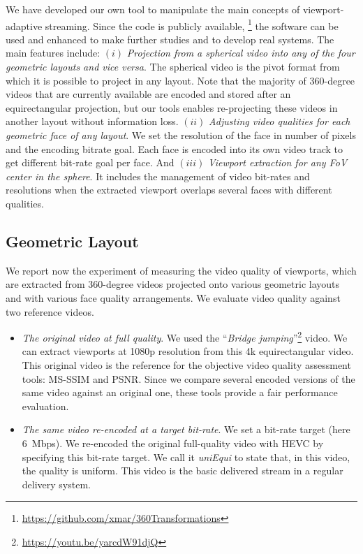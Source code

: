 We have developed our own tool to manipulate the main concepts
of viewport-adaptive streaming. Since the code is publicly available,%
\footnote{\url{https://github.com/xmar/360Transformations}} the software can be used and enhanced
to make further studies and to develop real systems. The main
features include: $(i)$ \emph{Projection from a spherical video into any of the four
geometric layouts and vice versa}. The spherical video is the pivot format from which it
is possible to project in any layout.
Note that the majority of 360-degree videos that are currently available are encoded and stored after
an equirectangular projection, but our tools enables re-projecting these videos
in another layout without information loss. $(ii)$ \emph{Adjusting video qualities for each
geometric face of any
layout}. We set the resolution of the face in number of
pixels and the encoding bitrate goal. Each face is encoded into its own video
track to get different
bit-rate goal per face. And $(iii)$ \emph{Viewport extraction for any \ac{FoV} center in the
sphere}. It includes the management of video bit-rates and resolutions
when the extracted viewport overlaps several faces with different qualities.

\subsection{Geometric Layout}

We report now the experiment of measuring the video quality of viewports, which
are extracted from 360-degree videos projected onto various geometric layouts and
with various
face quality arrangements. We evaluate video quality against two reference videos.
\begin{itemize}[leftmargin=7pt, itemindent=0pt, topsep=2pt, itemsep=0pt]
\item \emph{The original video at full quality}. We used the
``\emph{Bridge
jumping}''\footnote{\url{https://youtu.be/yarcdW91djQ}} video. We can extract viewports at 1080p resolution from this 4k equirectangular
video. This original video
is the reference for the objective video quality assessment tools: \ac{MS-SSIM} and
\ac{PSNR}. Since we compare several encoded versions of the same video against an original
one, these tools provide
a fair performance evaluation.
\item \emph{The same video re-encoded at a target bit-rate}. We set
a bit-rate target (here \SI{6}{\mega bps}). We
re-encoded the original full-quality video with \ac{HEVC} by specifying this bit-rate target. We call it \emph{uniEqui} to state that, in this
video, the quality is uniform. This video is the basic delivered stream in a regular delivery
system.
\end{itemize}

